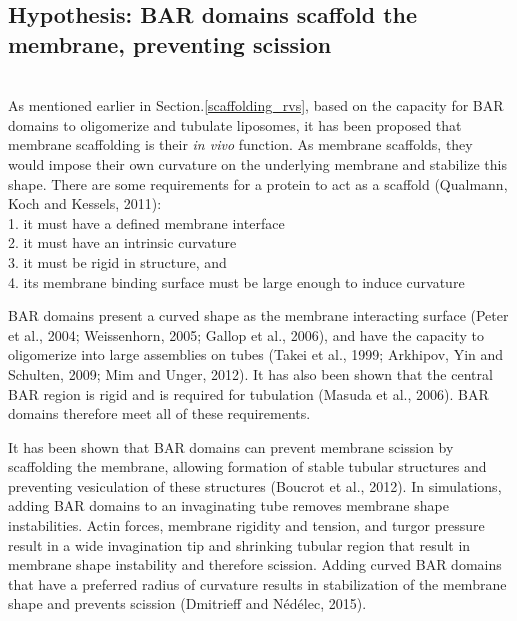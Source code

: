 \subsection{Hypothesis: BAR domains scaffold the membrane, preventing scission}
				\mbox{}\\
As mentioned earlier in Section.\ref{scaffolding_rvs}, based on the capacity for BAR domains to oligomerize and tubulate liposomes, it has been proposed that membrane scaffolding is their \textit{in vivo} function. As membrane scaffolds, they would impose their own curvature on the underlying membrane and stabilize this shape. There are some requirements for a protein to act as a scaffold (Qualmann, Koch and Kessels, 2011):\\
	1. it must have a defined membrane interface\\
	2. it must have an intrinsic curvature\\
	3. it must be rigid in structure, and\\
	4. its membrane binding surface must be large enough to induce curvature\\

\vspace{-1mm}

BAR domains present a curved shape as the membrane interacting surface (Peter et al., 2004; Weissenhorn, 2005; Gallop et al., 2006), and have the capacity to oligomerize into large assemblies on tubes (Takei et al., 1999; Arkhipov, Yin and Schulten, 2009; Mim and Unger, 2012). It has also been shown that the central BAR region is rigid and is required for tubulation (Masuda et al., 2006). BAR domains therefore meet all of these requirements. 

	\vspace{5mm}
It has been shown that BAR domains can prevent membrane scission by scaffolding the membrane, allowing formation of stable tubular structures and preventing vesiculation of these structures (Boucrot et al., 2012). In simulations, adding BAR domains to an invaginating tube removes membrane shape instabilities. Actin forces, membrane rigidity and tension, and turgor pressure result in a wide invagination tip and shrinking tubular region that result in membrane shape instability and therefore scission. Adding curved BAR domains that have a preferred radius of curvature results in stabilization of the membrane shape and prevents scission (Dmitrieff and Nédélec, 2015).

